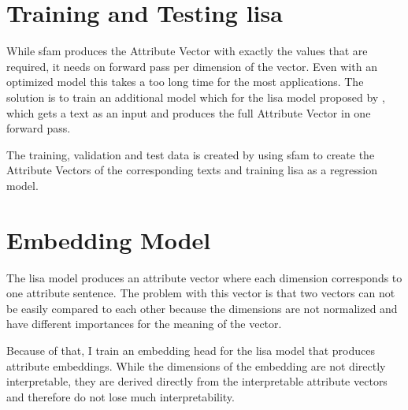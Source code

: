 \section{Training and Testing \acs{lisa}}
\label{sec:approach:lisa}
While \ac{sfam} produces the Attribute Vector with exactly the values that are required, it needs on forward pass per dimension of the vector. Even with an optimized model this takes a too long time for the most applications. The solution is to train an additional model which for the \acf{lisa} model proposed by \citet{patelLearningInterpretableStyle2023}, which gets a text as an input and produces the full Attribute Vector in one forward pass.

The training, validation and test data is created by using \ac{sfam} to create the Attribute Vectors of the corresponding texts and training \ac{lisa} as a regression model.


\section{Embedding Model}
\label{sec:approach:embedding}
The \ac{lisa} model produces an attribute vector where each dimension corresponds to one attribute sentence. The problem with this vector is that two vectors can not be easily compared to each other because the dimensions are not normalized and have different importances for the meaning of the vector.

Because of that, I train an embedding head for the \ac{lisa} model that produces attribute embeddings. While the dimensions of the embedding are not directly interpretable, they are derived directly from the interpretable attribute vectors and therefore do not lose much interpretability.

